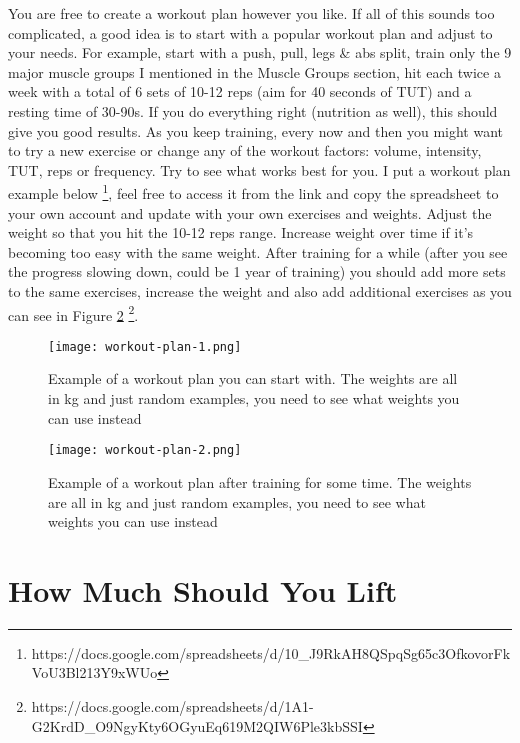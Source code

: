 \documentclass[openany, 12pt]{book}
\begin{document}
        You are free to create a workout plan however you like. If all of this sounds too complicated, a good idea is to start with a popular workout plan and adjust to your needs. For example, start
        with a push, pull, legs \& abs split, train only the 9 major muscle groups I mentioned in the Muscle Groups section, hit each twice a week with a total of 6 sets of 10-12 reps
        (aim for 40 seconds of TUT) and a resting time of 30-90s. If you do
        everything right (nutrition as well), this should give you good results. As you keep training, every now and then you might want to try a new exercise or change any of the workout factors:
        volume, intensity, TUT, reps or frequency. Try to see what works best for you.
        I put a workout plan example below
        \footnote{https://docs.google.com/spreadsheets/d/10\_J9RkAH8QSpqSg65c3OfkovorFkVoU3Bl213Y9xWUo}, feel
        free to access it from the link and copy the spreadsheet to your own account and update with your own exercises and weights. Adjust the weight so that you hit the 10-12 reps range.
        Increase weight over time if it's becoming too easy with the same weight. After training for a while (after you see the progress slowing down, could be 1 year of training)
        you should add more sets to the same exercises, increase the weight and also add additional exercises as you can see in Figure \ref{fig13}
        \footnote{https://docs.google.com/spreadsheets/d/1A1-G2KrdD\_O9NgyKty6OGyuEq619M2QIW6Ple3kbSSI}.

	\begin{figure}[h]
		\centering
		\texttt{[image: workout-plan-1.png]}
		\caption{Example of a workout plan you can start with. The weights are all in kg and just random examples, you need to see what weights you can use instead}
		\label{fig12}
	\end{figure}

	\begin{figure}[h]
		\centering
		\texttt{[image: workout-plan-2.png]}
		\caption{Example of a workout plan after training for some time. The weights are all in kg and just random examples, you need to see what weights you can use instead}
		\label{fig13}
	\end{figure}

        \section{How Much Should You Lift}
\end{document}

